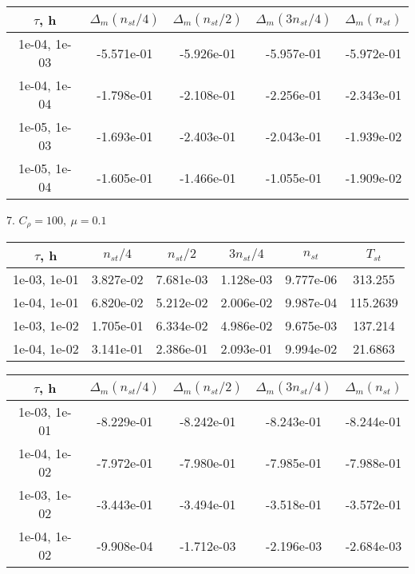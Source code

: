 \begin{center}
	\begin{tabular}{ |c|c|c|c|c| } 
		\hline
		$\tau$, h & $\Delta_m (n_{st}/ 4)$ & $\Delta_m (n_{st}/ 2)$ & $\Delta_m (3n_{st}/ 4)$ & $\Delta_m (n_{st})$ \\ 
		\hline
		1e-04, 1e-03 & -5.571e-01 & -5.926e-01 & -5.957e-01 & -5.972e-01 \\ 
		\hline
		1e-04, 1e-04 & -1.798e-01 & -2.108e-01 & -2.256e-01 & -2.343e-01 \\ 
		\hline
		1e-05, 1e-03 & -1.693e-01 & -2.403e-01 & -2.043e-01 & -1.939e-02 \\ 
		\hline
		1e-05, 1e-04 & -1.605e-01 & -1.466e-01 & -1.055e-01 & -1.909e-02 \\ 
		\hline
	\end{tabular}
\end{center}

7. $C_{\rho} = 100, \ \mu = 0.1$
\begin{center}
	\begin{tabular}{ |c|c|c|c|c|c| } 
		\hline
		$\tau$, h & $n_{st}/ 4$ & $n_{st}/ 2$ & $3n_{st}/ 4$ & $n_{st}$ & $T_{st}$ \\ 
		\hline
		1e-03, 1e-01 & 3.827e-02 & 7.681e-03 & 1.128e-03 & 9.777e-06 & 313.255\\ 
		\hline
		1e-04, 1e-01 & 6.820e-02 & 5.212e-02 & 2.006e-02 & 9.987e-04 & 115.2639\\ 
		\hline
		1e-03, 1e-02 & 1.705e-01 & 6.334e-02 & 4.986e-02 & 9.675e-03 & 137.214\\ 
		\hline
		1e-04, 1e-02 & 3.141e-01 & 2.386e-01 & 2.093e-01 & 9.994e-02 & 21.6863\\ 
		\hline
	\end{tabular}
\end{center}

\begin{center}
	\begin{tabular}{ |c|c|c|c|c| } 
		\hline
		$\tau$, h & $\Delta_m (n_{st}/ 4)$ & $\Delta_m (n_{st}/ 2)$ & $\Delta_m (3n_{st}/ 4)$ & $\Delta_m (n_{st})$ \\ 
		\hline
		1e-03, 1e-01 & -8.229e-01 & -8.242e-01 & -8.243e-01 & -8.244e-01 \\ 
		\hline
		1e-04, 1e-02 & -7.972e-01 & -7.980e-01 & -7.985e-01 & -7.988e-01 \\ 
		\hline
		1e-03, 1e-02 & -3.443e-01 & -3.494e-01 & -3.518e-01 & -3.572e-01 \\ 
		\hline
		1e-04, 1e-02 & -9.908e-04 & -1.712e-03 & -2.196e-03 & -2.684e-03 \\ 
		\hline
	\end{tabular}
\end{center}

